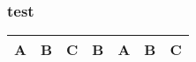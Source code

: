 \documentclass[xcolor=table]{beamer}
\begin{document}
\begin{frame}
\frametitle{test}

\begin{tabular}{|c|c|c|c|c|c|c|}
\hline
\cellcolor{blue!25}A&
\cellcolor{blue!25}B&
\cellcolor{blue!25}C&
B&
A&
B&
C\\
\hline
\end{tabular}
\end{frame}
\end{document}
